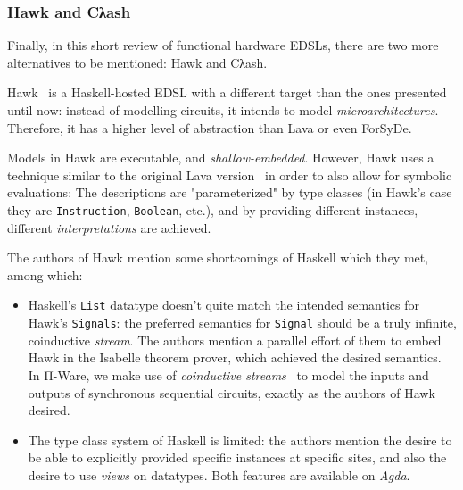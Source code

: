             \subsubsection{Hawk and Cλash}
            \label{subsubsec:hawk-clash}
            Finally, in this short review of functional hardware \acp{EDSL},
            there are two more alternatives to be mentioned: Hawk and Cλash.

            Hawk~\cite{hawk-haskell} is a Haskell-hosted \ac{EDSL} with a different target than
            the ones presented until now: instead of modelling circuits, it intends to model \emph{microarchitectures}.
            Therefore, it has a higher level of abstraction than Lava or even ForSyDe.

            Models in Hawk are executable, and \emph{shallow-embedded}.
            However, Hawk uses a technique similar to the original Lava version~\cite{lava-1999}
            in order to also allow for symbolic evaluations:
            The descriptions are "parameterized" by type classes
            (in Hawk's case they are \texttt{Instruction}, \texttt{Boolean}, etc.),
            and by providing different instances, different \emph{interpretations} are achieved.

            The authors of Hawk mention some shortcomings of Haskell which they met, among which:

            \begin{itemize}
                \item Haskell's \texttt{List} datatype doesn't quite match
                    the intended semantics for Hawk's \texttt{Signals}:
                    the preferred semantics for \texttt{Signal} should be a truly infinite, coinductive \emph{stream}.
                    The authors mention a parallel effort of them to embed Hawk in the Isabelle theorem prover,
                    which achieved the desired semantics.
                    In Π-Ware, we make use of \emph{coinductive streams}~\cite{introduction-coalgebra-jacobs}
                    to model the inputs and outputs of synchronous sequential circuits,
                    exactly as the authors of Hawk desired.
                \item The type class system of Haskell is limited: the authors mention the desire to be able
                    to explicitly provided specific instances at specific sites,
                    and also the desire to use \emph{views} on datatypes.
                    Both features are available on \emph{Agda}.
            \end{itemize}

